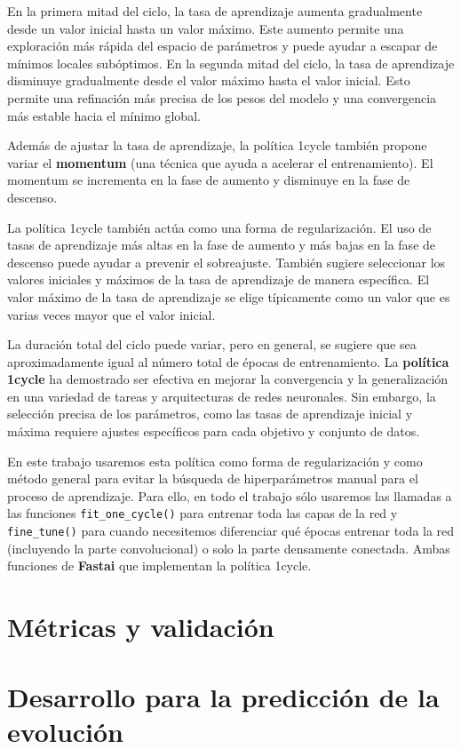 En la primera mitad del ciclo, la tasa de aprendizaje aumenta gradualmente desde un valor inicial hasta un valor máximo. Este aumento permite una exploración más rápida del espacio de parámetros y puede ayudar a escapar de mínimos locales subóptimos. En la segunda mitad del ciclo, la tasa de aprendizaje disminuye gradualmente desde el valor máximo hasta el valor inicial. Esto permite una refinación más precisa de los pesos del modelo y una convergencia más estable hacia el mínimo global.

Además de ajustar la tasa de aprendizaje, la política 1cycle también propone variar el \textbf{momentum} (una técnica que ayuda a acelerar el entrenamiento). El momentum se incrementa en la fase de aumento y disminuye en la fase de descenso.

La política 1cycle también actúa como una forma de regularización. El uso de tasas de aprendizaje más altas en la fase de aumento y más bajas en la fase de descenso puede ayudar a prevenir el sobreajuste. También sugiere seleccionar los valores iniciales y máximos de la tasa de aprendizaje de manera específica. El valor máximo de la tasa de aprendizaje se elige típicamente como un valor que es varias veces mayor que el valor inicial.

La duración total del ciclo puede variar, pero en general, se sugiere que sea aproximadamente igual al número total de épocas de entrenamiento.
La \textbf{política 1cycle} ha demostrado ser efectiva en mejorar la convergencia y la generalización en una variedad de tareas y arquitecturas de redes neuronales. Sin embargo, la selección precisa de los parámetros, como las tasas de aprendizaje inicial y máxima requiere ajustes específicos para cada objetivo y conjunto de datos.

En este trabajo usaremos esta política como forma de regularización y como método general para evitar la búsqueda de hiperparámetros manual para el proceso de aprendizaje. Para ello, en todo el trabajo sólo usaremos las llamadas a las funciones \texttt{fit\_one\_cycle()} para entrenar toda las capas de la red y \texttt{fine\_tune()} para cuando necesitemos diferenciar qué épocas entrenar toda la red (incluyendo la parte convolucional) o solo la parte densamente conectada. Ambas funciones de \textbf{Fastai} que implementan la política 1cycle. 

\section{Métricas y validación}

\section{Desarrollo para la predicción de la evolución}